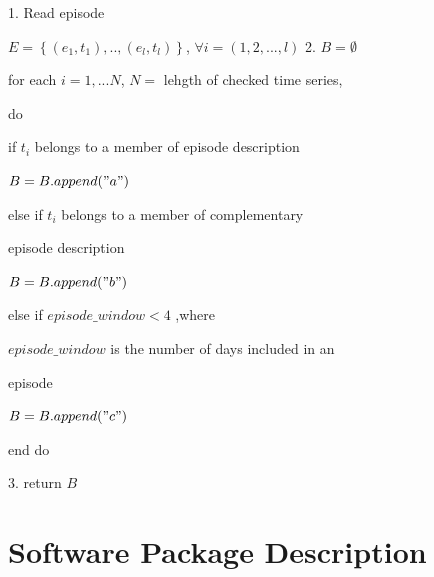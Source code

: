 \documentclass[10pt, conference, compsocconf]{IEEEtran}
\begin{document}
1. Read episode 
\par\quad $E=\left \{ (e_{1},t_{1}),..,(e_{l},t_{l}) \right \}$, $\forall i=(1,2,...,l)$
2. $B=\emptyset$
\par\quad for each $i=1,...N$, $N=$ lehgth of checked time series, 
\par\quad do
\par\quad if $t_{i}$ belongs to a member of episode description
\par\quad $B=B.append("a")$
\par\quad else if $t_{i}$ belongs to a member of complementary 
\par\quad episode description
\par\quad $B=B.append("b")$
\par\quad else if $episode\_window<4$ ,where
\par\quad $episode\_window$ is the number of days included in an 
\par\quad episode
\par\quad $B=B.append("c")$
\par\quad end do
\par
3. return $B$
\vspace{0.6mm}
\par


\section{Software Package Description}
\end{document}
